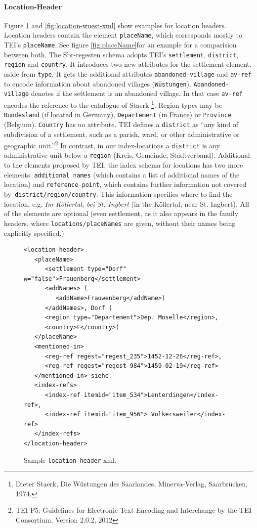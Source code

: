 \paragraph{Location-Header}
Figure \ref{fig:location-header-xml} and \ref{fig:location-wuest-xml} show examples for location headers. Location headers contain the element \texttt{placeName}, which corresponds mostly to TEI's \texttt{placeName}. See figure \ref{fig:placeName}for an example for a comparision between both. The Sbr-regesten schema adopts TEI's \texttt{settlement}, \texttt{district}, \texttt{region} and \texttt{country}. It introduces two new attributes for the settlement element, aside from \texttt{type}. It gets the additional attributes \texttt{abandoned-village} and \texttt{av-ref} to encode information about abandoned villages (\texttt{Wüstungen}). \texttt{Abandoned-village} denotes if the settlement is an abandoned village. In that case \texttt{av-ref} encodes the reference to the catalogue of Staerk \footnote{Dieter Staerk, Die Wüstungen des Saarlandes, Minerva-Verlag, Saarbrücken, 1974.}. Region types may be \texttt{Bundesland} (if located in Germany), \texttt{Departement} (in France) or \texttt{Province} (Belgium). \texttt{Country} has no attribute. TEI defines a \texttt{district} as “any kind of subdivision of a settlement, such as a parish, ward, or other administrative or geographic unit.”\footnote{TEI P5: Guidelines for Electronic Text Encoding and Interchange by the TEI Consortium, Version 2.0.2, 2012} In contrast, in our index-locations a \texttt{district} is any administrative unit below a \texttt{region} (Kreis, Gemeinde, Stadtverband).
Additional to the elements proposed by TEI, the index schema for locations has two more elements: \texttt{additional names} (which contains a list of additional names of the location) and \texttt{reference-point}, which contains further information not covered by\texttt{ district/region/country}. This information specifies where to find the location, e.g. \textit{Im Köllertal, bei St. Ingbert} (in the Köllertal, near St. Ingbert). All of the elements are optional (even settlement, as it also appears in the family headers, where \texttt{locations/placeNames} are given, without their names being explicitly specified.)   

\begin{figure}[H]
\centering
\begin{verbatim}
<location-header>
   <placeName>
      <settlement type="Dorf" w="false">Frauenberg</settlement>
      <addNames> (
         <addName>Frauwenberg</addName>)
      </addNames>, Dorf (
      <region type="Departement">Dep. Moselle</region>, 
      <country>F</country>) 
   </placeName>
   <mentioned-in>
      <reg-ref regest="regest_235">1452-12-26</reg-ref>, 
      <reg-ref regest="regest_984">1459-02-19</reg-ref>
   </mentioned-in> siehe 
   <index-refs>
      <index-ref itemid="item_534">Lenterdingen</index-ref>,
      <index-ref itemid="item_956"> Volkersweiler</index-ref>
   </index-refs>
</location-header>
\end{verbatim}
\label{fig:location-header-xml}
\caption{Sample \texttt{location-header} xml.}
\end{figure}

